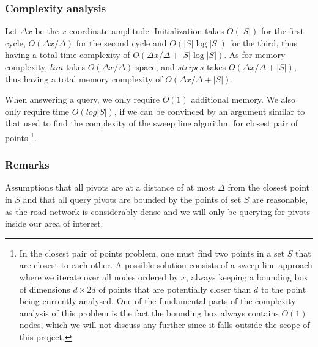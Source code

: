 \subsubsection{Complexity analysis}
Let $\Delta x$ be the $x$ coordinate amplitude. Initialization takes $O(|S|)$ for the first cycle, $O(\Delta x / \Delta)$ for the second cycle and $O(|S| \log |S|)$ for the third, thus having a total time complexity of $O(\Delta x / \Delta + |S| \log |S|)$. As for memory complexity, $lim$ takes $O(\Delta x / \Delta)$ space, and $stripes$ takes $O(\Delta x / \Delta + |S|)$, thus having a total memory complexity of $O(\Delta x / \Delta + |S|)$.\par
When answering a query, we only require $O(1)$ additional memory. We also only require time $O(log |S|)$, if we can be convinced by an argument similar to that used to find the complexity of the \gls{sweep line} algorithm for closest pair of points \footnote{In the closest pair of points problem, one must find two points in a set $S$ that are closest to each other. \href{https://www.cs.mcgill.ca/~cs251/ClosestPair/ClosestPairPS.html}{A possible solution} consists of a sweep line approach where we iterate over all nodes ordered by $x$, always keeping a bounding box of dimensions $d \times 2d$ of points that are potentially closer than $d$ to the point being currently analysed. One of the fundamental parts of the complexity analysis of this problem is the fact the bounding box always contains $O(1)$ nodes, which we will not discuss any further since it falls outside the scope of this project.}.
\subsubsection{Remarks}
Assumptions that all pivots are at a distance of at most $\Delta$ from the closest point in $S$ and that all query pivots are bounded by the points of set $S$ are reasonable, as the road network is considerably dense and we will only be querying for pivots inside our area of interest.